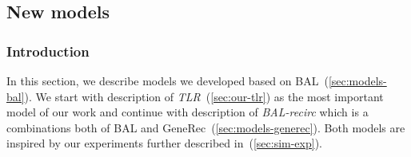 \subsection{New models}
\label{sec:sim-our} 

\subsubsection*{Introduction} 
In this section, we describe models we developed based on BAL~(\ref{sec:models-bal}). We start with description of \emph{TLR}~(\ref{sec:our-tlr}) as the most important model of our work and continue with description of \emph{BAL-recirc} which is a combinations both of BAL and GeneRec~(\ref{sec:models-generec}). Both models are inspired by our experiments further described in~(\ref{sec:sim-exp}). 

 



